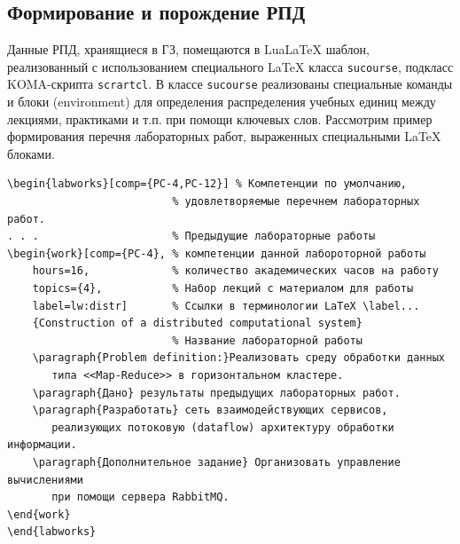 \documentclass[
]{aiitart}
\providecommand{\LuaLaTeX}{Lua\LaTeX}
\begin{document}
\subsection{Формирование и порождение РПД}

Данные РПД, хранящиеся в ГЗ, помещаются в \LuaLaTeX{} шаблон, реализованный с использованием специального \LaTeX{} класса \verb|sucourse|, подкласс KOMA-скрипта \verb|scrartcl|.  В классе \verb|sucourse| реализованы специальные команды и блоки (environment) для определения распределения учебных единиц между лекциями, практиками и т.п. при помощи ключевых слов. Рассмотрим пример формирования перечня лабораторных работ, выраженных специальными \LaTeX{} блоками.

\begin{verbatim}
\begin{labworks}[comp={PC-4,PC-12}] % Компетенции по умолчанию,
                          % удовлетворяемые перечнем лабораторных работ.
. . .                     % Предыдущие лабораторные работы
\begin{work}[comp={PC-4}, % компетенции данной лабороторной работы
    hours=16,             % количество академических часов на работу
    topics={4},           % Набор лекций с материалом для работы
    label=lw:distr]       % Ссылки в терминологии LaTeX \label...
    {Construction of a distributed computational system}
                          % Название лабораторной работы
    \paragraph{Problem definition:}Реализовать среду обработки данных
       типа <<Map-Reduce>> в горизонтальном кластере.
    \paragraph{Дано} результаты предыдущих лабораторных работ.
    \paragraph{Разработать} сеть взаимодействующих сервисов,
       реализующих потоковую (dataflow) архитектуру обработки информации.
    \paragraph{Дополнительное задание} Организовать управление вычислениями
       при помощи сервера RabbitMQ.
\end{work}
\end{labworks}
\end{verbatim}
\end{document}
